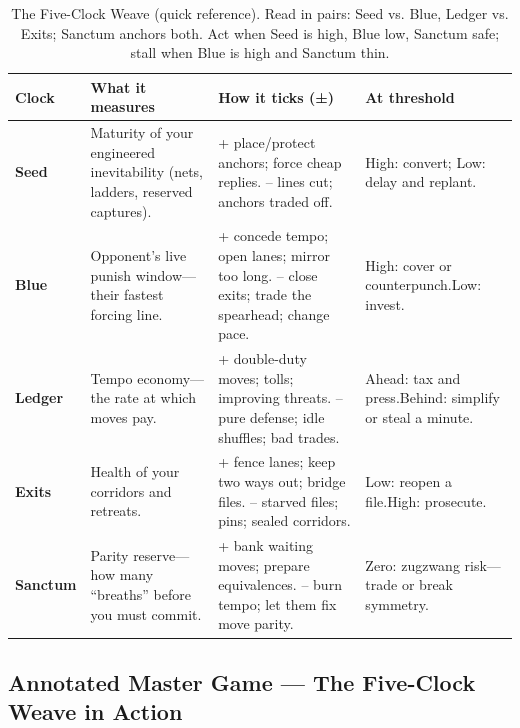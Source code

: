 \documentclass[11pt]{article}
\renewcommand{\arraystretch}{1.15}
\begin{document}
\begin{table}[h]
\centering
\renewcommand{\arraystretch}{1.1}
\begin{tabular}{p{2.6cm} p{5.2cm} p{5.0cm} p{3.2cm}}
\hline
\textbf{Clock} & \textbf{What it measures} & \textbf{How it ticks (±)} & \textbf{At threshold} \\
\hline
\textbf{Seed} &
Maturity of your engineered inevitability (nets, ladders, reserved captures). &
{+ place/protect anchors; force cheap replies.\newline
-- lines cut; anchors traded off.} &
High: convert; Low: delay and replant. \\
\hline
\textbf{Blue} &
Opponent's live punish window---their fastest forcing line. &
{+ concede tempo; open lanes; mirror too long.\newline
-- close exits; trade the spearhead; change pace.} &
High: cover or counterpunch.\newline Low: invest. \\
\hline
\textbf{Ledger} &
Tempo economy---the rate at which moves pay. &
{+ double-duty moves; tolls; improving threats.\newline
-- pure defense; idle shuffles; bad trades.} &
Ahead: tax and press.\newline Behind: simplify or steal a minute. \\
\hline
\textbf{Exits} &
Health of your corridors and retreats. &
{+ fence lanes; keep two ways out; bridge files.\newline
-- starved files; pins; sealed corridors.} &
Low: reopen a file.\newline High: prosecute. \\
\hline
\textbf{Sanctum} &
Parity reserve---how many ``breaths'' before you must commit. &
{+ bank waiting moves; prepare equivalences.\newline
-- burn tempo; let them fix move parity.} &
Zero: zugzwang risk---trade or break symmetry. \\
\hline
\end{tabular}
\caption{The Five-Clock Weave (quick reference). Read in pairs: Seed vs. Blue, Ledger vs. Exits; Sanctum anchors both. Act when Seed is high, Blue low, Sanctum safe; stall when Blue is high and Sanctum thin.}
\end{table}

\clearpage

\subsection*{Annotated Master Game --- The Five-Clock Weave in Action}
\label{sec:annotated-five-breath}
\end{document}
